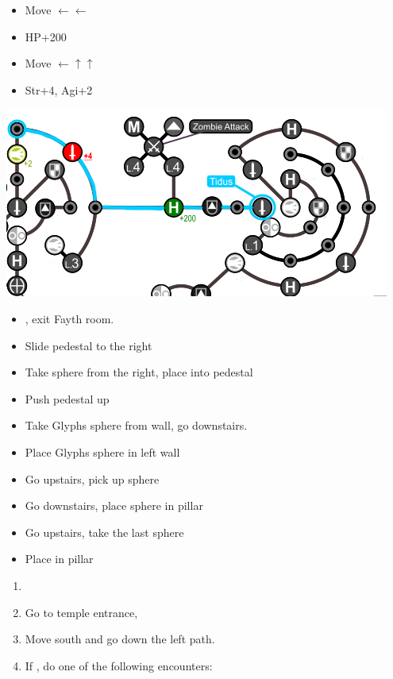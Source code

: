 \begin{spheregrid}
  \begin{itemize}
    \tidusf
    \begin{itemize}
      \item Move $\leftarrow\leftarrow$
      \item HP+200
      \item Move $\leftarrow\uparrow\uparrow$
      \item Str+4, Agi+2
    \end{itemize}
    \includegraphics[width=.8\columnwidth]{graphics/Tidus_Post_Seymour}
  \end{itemize}
\end{spheregrid}
\vfill
\begin{trial}
  \begin{itemize}
    \item \save, exit Fayth room.
    \item Slide pedestal to the right
    \item Take sphere from the right, place into pedestal
    \item Push pedestal up
    \item Take Glyphs sphere from wall, go downstairs.
    \item Place Glyphs sphere in left wall
    \item Go upstairs, pick up sphere
    \item Go downstairs, place sphere in pillar
    \item Go upstairs, take the last sphere
    \item Place in pillar
  \end{itemize}
\end{trial}
\begin{enumerate}[resume]
  \item \formation{\rikku}{\tidus}{\yuna}
  \item Go to temple entrance, \sd
  \item Move south and go down the left path.
  \item If \blitzloss, do one of the following encounters:
\end{enumerate}
